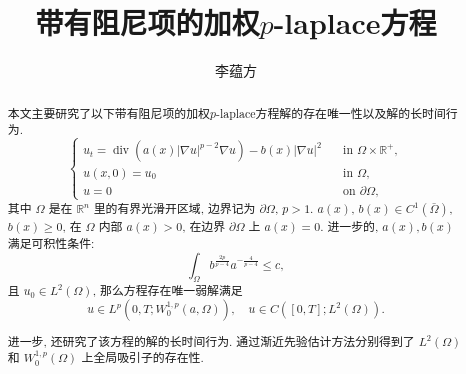 \documentclass[oneside,longtitle]{LZUthesis}
\numberwithin{equation}{chapter}
\newcommand*\abs[1]{\lvert#1\rvert}
\newcommand\R{\mathbb{R}}
\DeclareMathOperator{\Div}{div}
\begin{document}
\classification{}

\confidential{}

\title{带有阻尼项的加权$p$-laplace方程}




\author{李蕴方}






\submitdate{}


\degreedate{}


\maketitle

\makestatement

\frontmatter{}

\begin{abstract}
	本文主要研究了以下带有阻尼项的加权$p$-laplace方程解的存在唯一性以及解的长时间行为.
	\begin{equation*}
		\begin{cases}
			u_t = \Div(a(x)\abs{\nabla u}^{p-2}\nabla u) - b(x)\abs{\nabla u}^2 \quad &\text{in } \Omega \times \R^+,\\
			u(x,0) = u_0 \quad &\text{in } \Omega,\\
			u = 0 \quad &\text{on } \partial\Omega,
		\end{cases}
	\end{equation*}
	其中 $\Omega$ 是在 $\R^{n}$ 里的有界光滑开区域, 边界记为 $\partial\Omega$, $p>1$.
	$ a(x)$, $b(x) \in C^1(\bar{\Omega}) $, $b(x) \geq 0$, 在 $\Omega$ 内部 $a(x) > 0$, 在边界 $\partial\Omega$ 上 $a(x) = 0$.
	进一步的, $a(x), b(x)$ 满足可积性条件:
	\begin{equation*}
		\int_{\Omega} b^{\frac{2p}{p-4}}a^{-\frac{4}{p-4}} \leq c,
	\end{equation*}
	且 $u_0 \in L^2(\Omega) $, 那么方程存在唯一弱解满足
	\begin{equation*}
		u \in L^p(0, T; W_0^{1,p}(a,\Omega)), \quad u \in C([0, T]; L^2(\Omega)).
	\end{equation*}

	进一步, 还研究了该方程的解的长时间行为. 通过渐近先验估计方法分别得到了 $L^2(\Omega)$ 和 $W_0^{1,p}(\Omega)$ 上全局吸引子的存在性.
\end{abstract}
\end{document}
